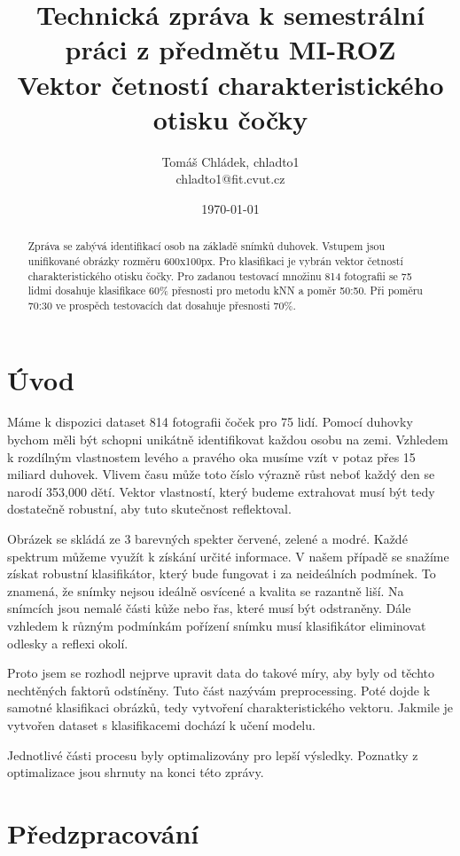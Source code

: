 \documentclass[a4paper,10pt,twocolumn]{article}
\title{Technická zpráva k semestrální práci z předmětu MI-ROZ \\ Vektor četností charakteristického otisku čočky}
\date{\today}
\author{Tomáš Chládek, chladto1 \\ chladto1@fit.cvut.cz}
\begin{document}
\maketitle
\begin{abstract}
Zpráva se zabývá identifikací osob na základě snímků duhovek. Vstupem jsou unifikované obrázky rozměru 600x100px. Pro klasifikaci je vybrán vektor četností charakteristického otisku čočky. Pro zadanou testovací množinu 814 fotografii se 75 lidmi dosahuje klasifikace 60\% přesnosti pro metodu kNN a poměr 50:50. Při poměru 70:30 ve prospěch testovacích dat dosahuje přesnosti 70\%.
\end{abstract}

%
\section{Úvod}
Máme k dispozici dataset 814 fotografii čoček pro 75 lidí. Pomocí duhovky bychom měli být schopni unikátně identifikovat každou osobu na zemi. Vzhledem k rozdílným vlastnostem levého a pravého oka musíme vzít v potaz přes 15 miliard duhovek. Vlivem času může toto číslo výrazně růst neboť každý den se narodí 353,000 dětí.\cite{worldPopupation} Vektor vlastností, který budeme extrahovat musí být tedy dostatečně robustní, aby tuto skutečnost reflektoval.\par
Obrázek se skládá ze 3 barevných spekter červené, zelené a modré. Každé spektrum můžeme využít k získání určité informace. V našem případě se snažíme získat robustní klasifikátor, který bude fungovat i za neideálních podmínek. To znamená, že snímky nejsou ideálně osvícené a kvalita se razantně liší. Na snímcích jsou nemalé části kůže nebo řas, které musí být odstraněny. Dále vzhledem k různým podmínkám pořízení snímku musí klasifikátor eliminovat odlesky a reflexi okolí.\par
Proto jsem se rozhodl nejprve upravit data do takové míry, aby byly od těchto nechtěných faktorů odstíněny. Tuto část nazývám preprocessing. Poté dojde k samotné klasifikaci obrázků, tedy vytvoření charakteristického vektoru. Jakmile je vytvořen dataset s klasifikacemi dochází k učení modelu. \par
Jednotlivé části procesu byly optimalizovány pro lepší výsledky. Poznatky z optimalizace jsou shrnuty na konci této zprávy.


\section{Předzpracování}
\end{document}
